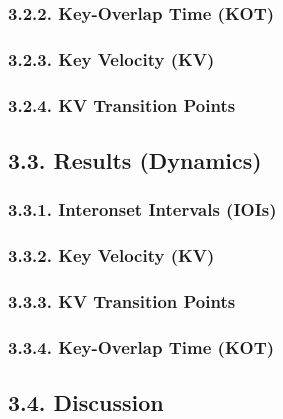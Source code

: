 \documentclass[
  english,
  man,floatsintext]{apa6}
\begin{document}
\hypertarget{key-overlap-time-kot-2}{%
\subsubsection{3.2.2. Key-Overlap Time (KOT)}\label{key-overlap-time-kot-2}}

\hypertarget{key-velocity-kv-2}{%
\subsubsection{3.2.3. Key Velocity (KV)}\label{key-velocity-kv-2}}

\hypertarget{kv-transition-points-2}{%
\subsubsection{3.2.4. KV Transition Points}\label{kv-transition-points-2}}

\hypertarget{results-dynamics-1}{%
\subsection{3.3. Results (Dynamics)}\label{results-dynamics-1}}

\hypertarget{interonset-intervals-iois-3}{%
\subsubsection{3.3.1. Interonset Intervals (IOIs)}\label{interonset-intervals-iois-3}}

\hypertarget{key-velocity-kv-3}{%
\subsubsection{3.3.2. Key Velocity (KV)}\label{key-velocity-kv-3}}

\hypertarget{kv-transition-points-3}{%
\subsubsection{3.3.3. KV Transition Points}\label{kv-transition-points-3}}

\hypertarget{key-overlap-time-kot-3}{%
\subsubsection{3.3.4. Key-Overlap Time (KOT)}\label{key-overlap-time-kot-3}}

\hypertarget{discussion-1}{%
\subsection{3.4. Discussion}\label{discussion-1}}
\end{document}
